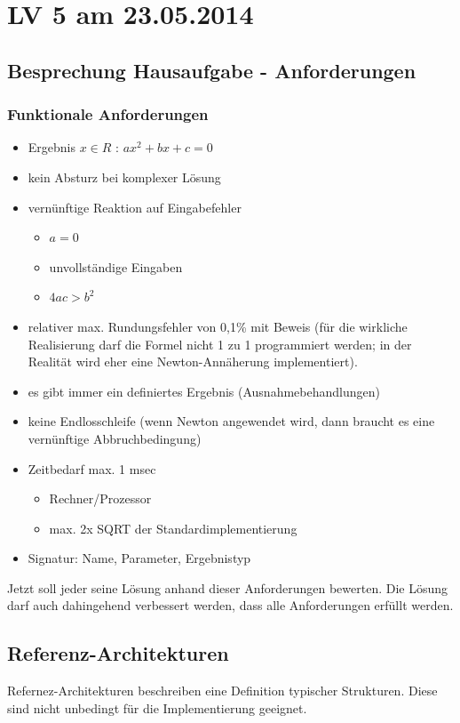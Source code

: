 \chapter{LV 5 am 23.05.2014}
\section{Besprechung Hausaufgabe - Anforderungen}
\subsection{Funktionale Anforderungen}
\begin{itemize}
\item Ergebnis $x \in R$ : $ax^2 + bx + c = 0$
\item kein Absturz bei komplexer Lösung
\item vernünftige Reaktion auf Eingabefehler
	\begin{itemize}
		\item $a = 0$
		\item unvollständige Eingaben
		\item $4ac > b^2$
	\end{itemize}
\item relativer max. Rundungsfehler von 0,1\% mit Beweis (für die wirkliche  Realisierung darf die Formel nicht 1 zu 1 programmiert werden; in der Realität wird eher eine Newton-Annäherung implementiert).
\item es gibt immer ein definiertes Ergebnis (Ausnahmebehandlungen)
\item keine Endlosschleife (wenn Newton angewendet wird, dann braucht es eine vernünftige Abbruchbedingung)
\item Zeitbedarf max. 1 msec
	\begin{itemize}
		\item Rechner/Prozessor
		\item max. 2x SQRT der Standardimplementierung
	\end{itemize}
\item Signatur: Name, Parameter, Ergebnistyp
\end{itemize}

Jetzt soll jeder seine Lösung anhand dieser Anforderungen bewerten. Die Lösung darf auch dahingehend verbessert werden, dass alle Anforderungen erfüllt werden.

\section{Referenz-Architekturen}
Refernez-Architekturen beschreiben eine Definition typischer Strukturen. Diese sind nicht unbedingt für die Implementierung geeignet.

